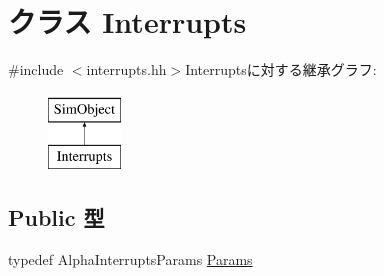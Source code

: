 \hypertarget{classAlphaISA_1_1Interrupts}{
\section{クラス Interrupts}
\label{classAlphaISA_1_1Interrupts}
}


{\ttfamily \#include $<$interrupts.hh$>$}Interruptsに対する継承グラフ:\begin{figure}[H]
\begin{center}
\leavevmode
\includegraphics[height=2cm]{classAlphaISA_1_1Interrupts}
\end{center}
\end{figure}
\subsection*{Public 型}
\begin{DoxyCompactItemize}
\item 
typedef AlphaInterruptsParams \hyperlink{classAlphaISA_1_1Interrupts_acac734c7c124173e3940e672404775c6}{Params}
\end{DoxyCompactItemize}
